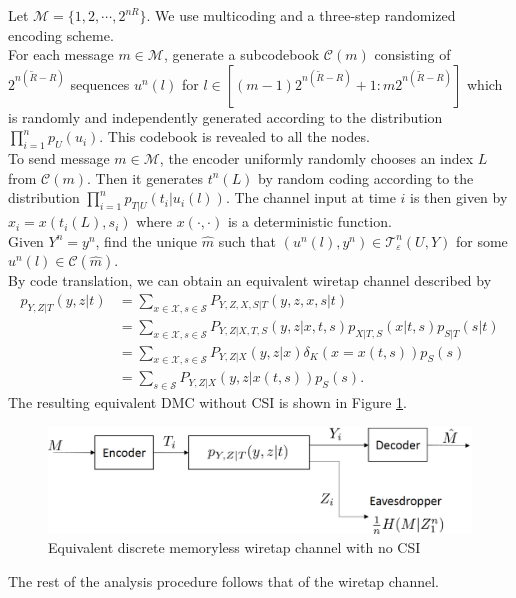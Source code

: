 \documentclass[12pt, Draft, onecolumn]{IEEEtran}
\def\calC{{\mathcal{C}}}
\def\calM{{\mathcal{M}}}
\def\calS{{\mathcal{S}}}
\def\calX{{\mathcal{X}}}
\def\calT{{\mathcal{T}}}
\begin{document}
Let $\calM=\{1,2,\cdots,2^{nR}\}$. We use multicoding and a three-step randomized encoding scheme.\\

 For each message $m\in \calM$, generate a subcodebook $\calC(m)$ consisting of $2^{n(\tilde{R}-R)}$ sequences $u^n(l)$ for $l\in [(m-1)2^{n(\tilde{R}-R)}+1:m2^{n(\tilde{R}-R)}]$ which is randomly and independently generated according to the distribution $\prod_{i=1}^n p_U(u_i)$. This codebook is revealed to all the nodes.\\

 To send message $m\in\calM$, the encoder uniformly randomly chooses an index $L$ from $\calC(m)$. Then it generates $t^n(L)$ by random coding according to the distribution $\prod_{i=1}^n p_{T|U}(t_i|u_i(l))$. The channel input at time $i$ is then given by $x_i=x(t_i(L),s_i)$ where $x(\cdot,\cdot)$ is a deterministic function.\\

 Given $Y^n=y^n$, find the unique $\hat{m}$ such that $(u^n(l), y^n)\in\calT^n_{\varepsilon}(U,Y)$ for some $u^n(l)\in\calC(\hat{m})$.\\

 By code translation, we can obtain an equivalent wiretap channel described by
\begin{align*}
p_{Y,Z|T}(y,z|t) &= \sum_{x\in\calX, s\in\calS}P_{Y,Z,X,S|T}(y,z,x,s|t)\\
&= \sum_{x\in\calX, s\in\calS}P_{Y,Z|X,T,S}(y,z|x,t,s)p_{X|T,S}(x|t,s)p_{S|T}(s|t)\\
&= \sum_{x\in\calX, s\in\calS}P_{Y,Z|X}(y,z|x)\delta_K(x=x(t,s))p_{S}(s)\\
&= \sum_{s\in\calS}P_{Y,Z|X}(y,z|x(t,s))p_{S}(s).
\end{align*}
The resulting equivalent DMC without CSI is shown in Figure \ref{fig.secrecy_noCSIR_channel_equivalent}.
\begin{figure}[h]
\centering
\includegraphics[scale=.6]{figs/secrecy_noCSIR_channel_equivalent}
\caption{Equivalent discrete memoryless wiretap channel with no CSI}
\label{fig.secrecy_noCSIR_channel_equivalent}
\end{figure}
The rest of the analysis procedure follows that of the wiretap channel.
\end{document}
